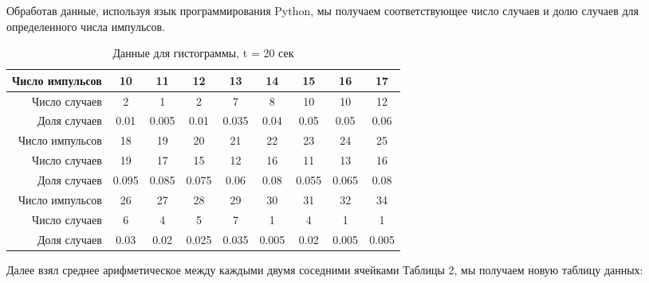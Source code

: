 \documentclass[a4paper, 12pt]{article}
\begin{document}
Обработав данные, используя язык программирования  Python, мы получаем соответствующее число случаев и долю случаев для определенного числа импульсов.  

\begin{table}[H]
	\centering
	\begin{tabular}{|r|c|c|c|c|c|c|c|c|}
		\hline
		Число импульсов & 10 & 11 & 12 & 13 & 14 & 15 & 16 & 17 \\ \hline
		
		Число случаев & 2 & 1 & 2 & 7 & 8 & 10 & 10 & 12 \\ \hline  
		
		Доля случаев & 0.01 & 0.005 & 0.01 & 0.035 & 0.04 & 0.05 & 0.05 & 0.06 \\ \hline 	
		
		Число импульсов & 18 & 19 & 20 & 21 & 22 & 23 & 24 & 25 \\ \hline
		
		Число случаев & 19 & 17 & 15 & 12 & 16 & 11 & 13 & 16 \\ \hline  
		
		Доля случаев & 0.095 & 0.085 & 0.075 & 0.06 & 0.08 & 0.055 & 0.065 & 0.08 \\ \hline 	
		
		Число импульсов & 26 & 27 & 28 & 29 & 30 & 31 & 32 & 34 \\ \hline
		
		Число случаев & 6 & 4 & 5 & 7 & 1 & 4 & 1 & 1 \\ \hline  
		
		Доля случаев & 0.03 & 0.02 & 0.025 & 0.035 & 0.005 & 0.02 & 0.005 & 0.005 \\ \hline 	
	\end{tabular}
	\caption{Данные для гистограммы, t = 20 сек}
\end{table}

Далее взял среднее арифметическое между каждыми двумя соседними ячейками Таблицы 2, мы получаем новую таблицу данных: 
\end{document}
